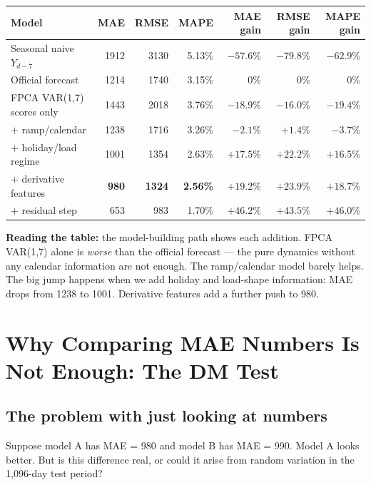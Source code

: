 \documentclass[11pt,a4paper]{article}
\begin{document}
\begin{center}
\begin{tabular}{lrrrrrr}
\toprule
Model & MAE & RMSE & MAPE & MAE gain & RMSE gain & MAPE gain \\
\midrule
Seasonal naive $Y_{d-7}$ & 1912 & 3130 & 5.13\% & $-57.6\%$ & $-79.8\%$ & $-62.9\%$ \\
Official forecast         & 1214 & 1740 & 3.15\% & 0\% & 0\% & 0\% \\
FPCA VAR(1,7) scores only & 1443 & 2018 & 3.76\% & $-18.9\%$ & $-16.0\%$ & $-19.4\%$ \\
$+$ ramp/calendar         & 1238 & 1716 & 3.26\% & $-2.1\%$ & $+1.4\%$ & $-3.7\%$ \\
$+$ holiday/load regime   & 1001 & 1354 & 2.63\% & $+17.5\%$ & $+22.2\%$ & $+16.5\%$ \\
$+$ derivative features   & \textbf{980} & \textbf{1324} & \textbf{2.56\%} & $+19.2\%$ & $+23.9\%$ & $+18.7\%$ \\
$+$ residual step         & 653 & 983 & 1.70\% & $+46.2\%$ & $+43.5\%$ & $+46.0\%$ \\
\bottomrule
\end{tabular}
\end{center}

\begin{intuitionbox}
\textbf{Reading the table:} the model-building path shows each
addition. FPCA VAR(1,7) alone is \emph{worse} than the official
forecast --- the pure dynamics without any calendar information are
not enough. The ramp/calendar model barely helps. The big jump
happens when we add holiday and load-shape information: MAE drops
from 1238 to 1001. Derivative features add a further push to 980.
\end{intuitionbox}

\section{Why Comparing MAE Numbers Is Not Enough: The DM Test}

\subsection{The problem with just looking at numbers}

Suppose model A has MAE = 980 and model B has MAE = 990. Model A
looks better. But is this difference real, or could it arise from
random variation in the 1,096-day test period?
\end{document}
